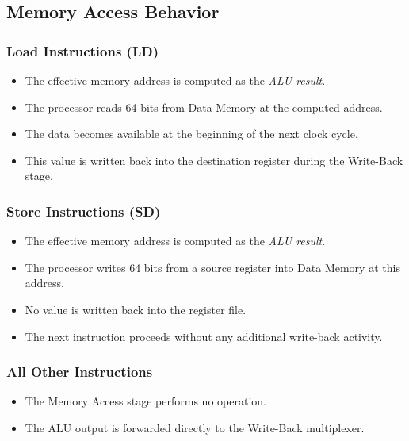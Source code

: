 \documentclass{article}
\begin{document}
\subsection{Memory Access Behavior}
    \subsubsection*{Load Instructions (LD)}
        \begin{itemize}
            \item The effective memory address is computed as the \textit{ALU result}.
            \item The processor reads 64 bits from Data Memory at the computed address.
            \item The data becomes available at the beginning of the next clock cycle.
            \item This value is written back into the destination register during the Write-Back stage.
        \end{itemize}

    \subsubsection*{Store Instructions (SD)}
        \begin{itemize}
            \item The effective memory address is computed as the \textit{ALU result}.
            \item The processor writes 64 bits from a source register into Data Memory at this address.
            \item No value is written back into the register file.
            \item The next instruction proceeds without any additional write-back activity.
        \end{itemize}
    \subsubsection*{All Other Instructions}
    \begin{itemize}
        \item The Memory Access stage performs no operation.
        \item The ALU output is forwarded directly to the Write-Back multiplexer.  
    \end{itemize}
\end{document}
